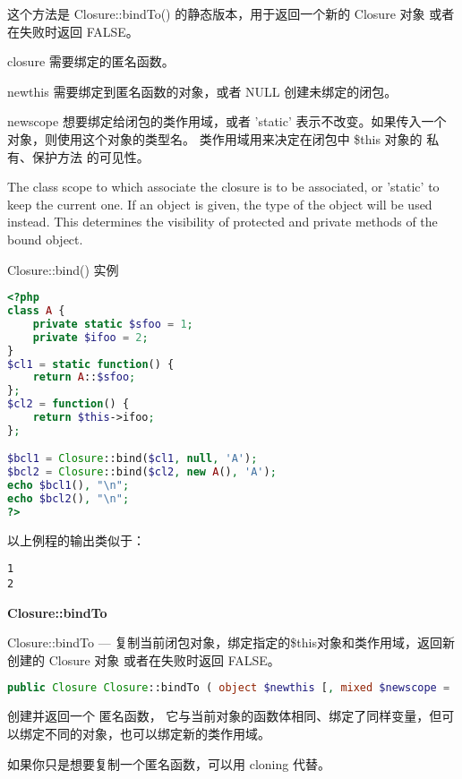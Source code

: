 这个方法是 Closure::bindTo() 的静态版本，用于返回一个新的 Closure 对象 或者在失败时返回 FALSE。

\begin{compactitem}
\item closure
需要绑定的匿名函数。
\item newthis
需要绑定到匿名函数的对象，或者 NULL 创建未绑定的闭包。
\item newscope
想要绑定给闭包的类作用域，或者 'static' 表示不改变。如果传入一个对象，则使用这个对象的类型名。 类作用域用来决定在闭包中 \$this 对象的 私有、保护方法 的可见性。 

The class scope to which associate the closure is to be associated, or 'static' to keep the current one. If an object is given, the type of the object will be used instead. This determines the visibility of protected and private methods of the bound object.

\end{compactitem}

\begin{example}
Closure::bind() 实例
\begin{lstlisting}[language=PHP]
<?php
class A {
    private static $sfoo = 1;
    private $ifoo = 2;
}
$cl1 = static function() {
    return A::$sfoo;
};
$cl2 = function() {
    return $this->ifoo;
};

$bcl1 = Closure::bind($cl1, null, 'A');
$bcl2 = Closure::bind($cl2, new A(), 'A');
echo $bcl1(), "\n";
echo $bcl2(), "\n";
?>
\end{lstlisting}
\end{example}

以上例程的输出类似于：

\begin{verbatim}
1
2
\end{verbatim}

\textbf{Closure::bindTo}

Closure::bindTo — 复制当前闭包对象，绑定指定的\$this对象和类作用域，返回新创建的 Closure 对象 或者在失败时返回 FALSE。

\begin{lstlisting}[language=PHP]
public Closure Closure::bindTo ( object $newthis [, mixed $newscope = 'static' ] )
\end{lstlisting}

创建并返回一个 匿名函数， 它与当前对象的函数体相同、绑定了同样变量，但可以绑定不同的对象，也可以绑定新的类作用域。

如果你只是想要复制一个匿名函数，可以用 cloning 代替。

